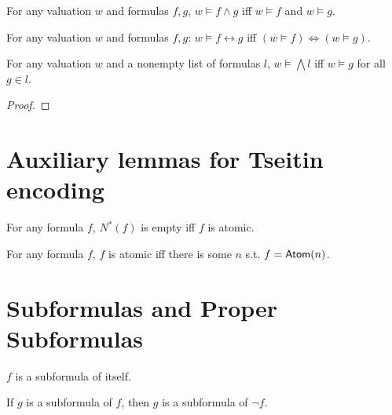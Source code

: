 \begin{lemma}
    \label{Satisfies.and}
    For any valuation $w$ and formulas $f,g$, $w \models f \wedge g$ iff $w \models f$ and $w \models g$.
\end{lemma}

\begin{lemma}
    \label{Satisfies.iff}
    For any valuation $w$ and formulas $f,g$: $w \models f \leftrightarrow g$ iff $(w \models f) \Leftrightarrow (w \models g)$.
\end{lemma}

\begin{lemma}
    \label{Satisfies.bigAnd}
    \leanok
    For any valuation $w$ and a nonempty list of formulas $l$, $w \models \bigwedge l$ iff $w \models g$ for all $g \in l$.
\end{lemma}
\begin{proof}
    \leanok
\end{proof}

\section{Auxiliary lemmas for Tseitin encoding}

\begin{lemma}
    \label{Ns_eq_empty_iff}
    \leanok
    For any formula $f$, $N^*(f)$ is empty iff $f$ is atomic.
\end{lemma}

\begin{lemma}
    \label{not_nonAtomic}
    \leanok
    For any formula $f$, $f$ is atomic iff there is some $n$ s.t. $f = \mathsf{Atom}(n)$.
\end{lemma}

\section{Subformulas and Proper Subformulas}

\begin{lemma}
    \label{sub_self}
    \leanok
    $f$ is a subformula of itself.
\end{lemma}

\begin{lemma}
    \label{sub_neg}
    \leanok
    If $g$ is a subformula of $f$, then $g$ is a subformula of $\neg f$.
\end{lemma}

